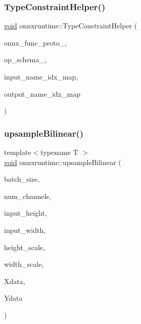\subsubsection{\texorpdfstring{Type\+Constraint\+Helper()}{TypeConstraintHelper()}}
{\footnotesize\ttfamily \mbox{\hyperlink{mlasi_8h_a88f941d423cb2a819b70a1358982b1a6}{void}} onnxruntime\+::\+Type\+Constraint\+Helper (\begin{DoxyParamCaption}\item[{const O\+N\+N\+X\+\_\+\+N\+A\+M\+E\+S\+P\+A\+C\+E\+::\+Function\+Proto $\ast$}]{onnx\+\_\+func\+\_\+proto\+\_\+,  }\item[{std\+::unique\+\_\+ptr$<$ O\+N\+N\+X\+\_\+\+N\+A\+M\+E\+S\+P\+A\+C\+E\+::\+Op\+Schema $>$ \&}]{op\+\_\+schema\+\_\+,  }\item[{std\+::unordered\+\_\+map$<$ std\+::string, int $>$ \&}]{input\+\_\+name\+\_\+idx\+\_\+map,  }\item[{std\+::unordered\+\_\+map$<$ std\+::string, int $>$ \&}]{output\+\_\+name\+\_\+idx\+\_\+map }\end{DoxyParamCaption})}

\mbox{\label{namespaceonnxruntime_a3737421ec6d1ac008d20b89f9812f674}} 
\subsubsection{\texorpdfstring{upsample\+Bilinear()}{upsampleBilinear()}}
{\footnotesize\ttfamily template$<$typename T $>$ \\
\mbox{\hyperlink{mlasi_8h_a88f941d423cb2a819b70a1358982b1a6}{void}} onnxruntime\+::upsample\+Bilinear (\begin{DoxyParamCaption}\item[{int64\+\_\+t}]{batch\+\_\+size,  }\item[{int64\+\_\+t}]{num\+\_\+channels,  }\item[{int64\+\_\+t}]{input\+\_\+height,  }\item[{int64\+\_\+t}]{input\+\_\+width,  }\item[{float}]{height\+\_\+scale,  }\item[{float}]{width\+\_\+scale,  }\item[{const T $\ast$}]{Xdata,  }\item[{T $\ast$}]{Ydata }\end{DoxyParamCaption})}

